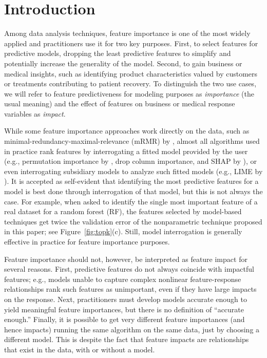 \documentclass[11pt]{article}
\newcommand{\figref}[1]{Figure~\ref{#1}}
\newcommand{\todo}[1]{{{\small\color{red}{[#1]}}}}
\begin{document}
\section{Introduction}
\label{sec:intro}

\todo{
integrating gradients for loss functions and neural networks

add how we tuned RF, other models. What is $R^2$?

we use all X,y
boston: 1 trial. min samples per x = 1
rent: defaults, 5 trials
flight: cat min samples leaf=2
bulldozer: default

tune GBM

number of trials is a hyper parameter

current limitations include
}

Among data analysis techniques, feature importance is one of the most widely applied and practitioners use it for two key purposes. First, to select features for predictive models, dropping the least predictive features to simplify and potentially increase the generality of the model. Second, to gain business or medical insights, such as identifying product characteristics valued by customers or treatments contributing to patient recovery.  To distinguish the two use cases, we will refer to feature predictiveness for modeling purposes as {\em importance} (the usual meaning) and the effect of features on business or medical response variables as {\em impact}.

While some feature importance approaches work directly on the data, such as minimal-redundancy-maximal-relevance (mRMR) by \cite{mRMR}, almost all algorithms used in practice rank features by interrogating a fitted model provided by the user (e.g., permutation importance by \citealt{RF}, drop column importance, and SHAP by \citealt{shap}), or even interrogating subsidiary models to analyze such fitted models (e.g., LIME by \citealt{lime}). It is accepted as self-evident that identifying the most predictive features for a model is best done through interrogation of that  model, but this is not always the case.  For example, when asked to identify the single most important feature of a real dataset \citep{bulldozer} for a random forest (RF), the features selected by model-based techniques get twice the validation error of the nonparametric technique proposed in this paper; see \figref{fig:topk}(c). Still, model interrogation is generally effective in practice for feature importance purposes.

Feature importance should not, however, be interpreted as feature impact for several reasons. First, predictive features do not always coincide with impactful features; e.g., models unable to capture complex nonlinear feature-response relationships rank such features as unimportant, even if they have large impacts on the response. Next, practitioners must develop models accurate enough to yield meaningful feature importances, but there is no definition of ``accurate enough.'' Finally, it is possible to get very different feature importances (and hence impacts) running the same algorithm on the same data, just by choosing a different model. This is despite the fact that feature impacts are relationships that exist in the data, with or without a model.
\end{document}
